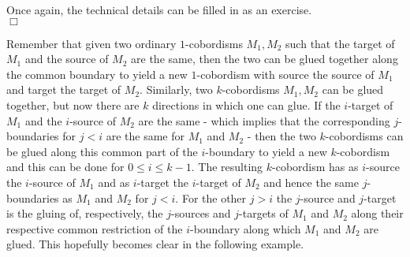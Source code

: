 \begin{prf}
Once again, the technical details can be filled in as an exercise.
\\
\phantom{proven}
\hfill
$\Box$
\end{prf}
Remember that given two ordinary $1$-cobordisms $M_{1},M_{2}$ such that the target of $M_{1}$ and the source of $M_{2}$ are the same, then the two can be glued together along the common boundary to yield a new $1$-cobordism with source the source of $M_{1}$ and target the target of $M_{2}$. Similarly, two $k$-cobordisms $M_{1},M_{2}$ can be glued together, but now there are $k$ directions in which one can glue. If the $i$-target of $M_{1}$ and the $i$-source of $M_{2}$ are the same - which implies that the corresponding $j$-boundaries for $j < i$ are the same for $M_{1}$ and $M_{2}$ - then the two $k$-cobordisms can be glued along this common part of the $i$-boundary to yield a new $k$-cobordism and this can be done for $0 \leq i \leq k-1$. The resulting $k$-cobordism has as $i$-source the $i$-source of $M_{1}$ and as $i$-target the $i$-target of $M_{2}$ and hence the same $j$-boundaries as $M_{1}$ and $M_{2}$ for $j < i$. For the other $j > i$ the $j$-source and $j$-target is the gluing of, respectively, the $j$-sources and $j$-targets of $M_{1}$ and $M_{2}$ along their respective common restriction of the $i$-boundary along which $M_{1}$ and $M_{2}$ are glued. This hopefully becomes clear in the following example.
\\
